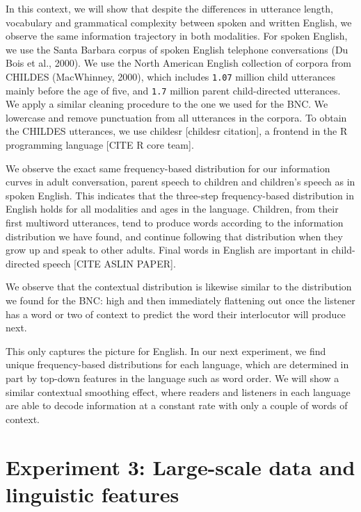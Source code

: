 \documentclass[10pt, letterpaper]{article}
\begin{document}
In this context, we will show that despite the differences in utterance
length, vocabulary and grammatical complexity between spoken and written
English, we observe the same information trajectory in both modalities.
For spoken English, we use the Santa Barbara corpus of spoken English
telephone conversations (Du Bois et al., 2000). We use the North
American English collection of corpora from CHILDES (MacWhinney, 2000),
which includes \texttt{1.07} million child utterances mainly before the
age of five, and \texttt{1.7} million parent child-directed utterances.
We apply a similar cleaning procedure to the one we used for the BNC. We
lowercase and remove punctuation from all utterances in the corpora. To
obtain the CHILDES utterances, we use childesr {[}childesr citation{]},
a frontend in the R programming language {[}CITE R core team{]}.

We observe the exact same frequency-based distribution for our
information curves in adult conversation, parent speech to children and
children's speech as in spoken English. This indicates that the
three-step frequency-based distribution in English holds for all
modalities and ages in the language. Children, from their first
multiword utterances, tend to produce words according to the information
distribution we have found, and continue following that distribution
when they grow up and speak to other adults. Final words in English are
important in child-directed speech {[}CITE ASLIN PAPER{]}.

We observe that the contextual distribution is likewise similar to the
distribution we found for the BNC: high and then immediately flattening
out once the listener has a word or two of context to predict the word
their interlocutor will produce next.

This only captures the picture for English. In our next experiment, we
find unique frequency-based distributions for each language, which are
determined in part by top-down features in the language such as word
order. We will show a similar contextual smoothing effect, where readers
and listeners in each language are able to decode information at a
constant rate with only a couple of words of context.

\hypertarget{experiment-3-large-scale-data-and-linguistic-features}{%
\section{Experiment 3: Large-scale data and linguistic
features}\label{experiment-3-large-scale-data-and-linguistic-features}}
\end{document}
